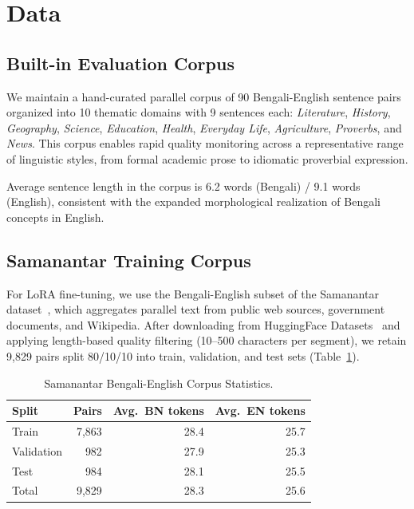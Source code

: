 \documentclass[conference]{IEEEtran}
\begin{document}
\section{Data}

\subsection{Built-in Evaluation Corpus}

We maintain a hand-curated parallel corpus of 90 Bengali-English sentence pairs
organized into 10 thematic domains with 9 sentences each:
\textit{Literature}, \textit{History}, \textit{Geography}, \textit{Science},
\textit{Education}, \textit{Health}, \textit{Everyday Life}, \textit{Agriculture},
\textit{Proverbs}, and \textit{News}.
This corpus enables rapid quality monitoring across a representative range of
linguistic styles, from formal academic prose to idiomatic proverbial expression.

Average sentence length in the corpus is 6.2 words (Bengali) / 9.1 words (English),
consistent with the expanded morphological realization of Bengali concepts in English.

\subsection{Samanantar Training Corpus}

For LoRA fine-tuning, we use the Bengali-English subset of the Samanantar
dataset~\cite{samanantar2022}, which aggregates parallel text from public web sources,
government documents, and Wikipedia.
After downloading from HuggingFace Datasets~\cite{lhoest2021datasets} and applying
length-based quality filtering (10--500 characters per segment), we retain 9,829 pairs
split 80/10/10 into train, validation, and test sets (Table~\ref{tab:corpus}).

\begin{table}[htbp]
\caption{Samanantar Bengali-English Corpus Statistics.}
\label{tab:corpus}
\centering
\begin{tabular}{lrrr}
\toprule
Split & Pairs & Avg.\ BN tokens & Avg.\ EN tokens \\
\midrule
Train & 7,863 & 28.4 & 25.7 \\
Validation & 982 & 27.9 & 25.3 \\
Test & 984 & 28.1 & 25.5 \\
\midrule
Total & 9,829 & 28.3 & 25.6 \\
\bottomrule
\end{tabular}
\end{table}
\end{document}
